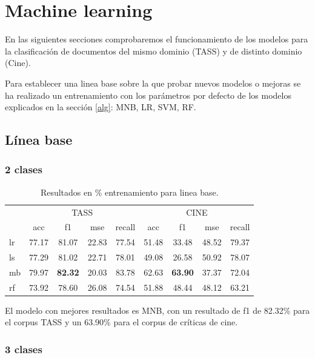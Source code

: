 \section{Machine learning}\label{sect:ML}

En las siguientes secciones comprobaremos el funcionamiento de los modelos para la clasificación de documentos del mismo dominio (TASS) y de distinto dominio (Cine).

Para establecer una linea base sobre la que probar  nuevos modelos o mejoras se ha realizado un entrenamiento con los parámetros por defecto de los modelos explicados en la sección \ref{alg}: MNB, LR, SVM, RF.


\subsection{Línea base}

\subsubsection{2 clases}

\begin{table}[H]
	\centering
	\begin{tabular}{|l|cccc|cccc|}
		\hline
		& \multicolumn{4}{c|}{TASS} & \multicolumn{4}{c|}{CINE} \\
		\cline{2-9}
		&    acc &     f1 &    mse &  recall & acc &     f1 &    mse &  recall \\
		\hline
		lr      &  77.17 &  81.07 &  22.83 &   77.54 &  51.48 &  33.48 &  48.52 &   79.37 \\
		ls      &  77.29 &  81.02 &  22.71 &   78.01 &  49.08 &  26.58 &  50.92 &   78.07 \\
		mb      &  79.97 &  \textbf{82.32} &  20.03 &   83.78 &  62.63 &  \textbf{63.90} &  37.37 &   72.04 \\
		rf      &  73.92 &  78.60 &  26.08 &   74.54 &  51.88 &  48.44 &  48.12 &   63.21 \\
		\hline
	\end{tabular}
	\caption{Resultados en \% entrenamiento para linea base.}
	\label{result-linea-base}
\end{table}

El modelo con mejores resultados es MNB, con un resultado de f1 de 82.32\% para el corpus TASS y un 63.90\% para el corpus de críticas de cine.


\subsubsection{3 clases}

